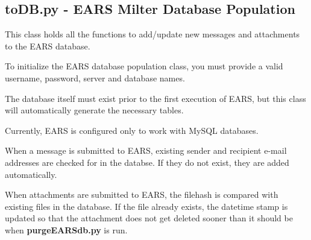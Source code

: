 \documentclass[letterpaper,10pt,english]{sphinxmanual}
\begin{document}
\label{codedocs/database:module-database.toDB}

\subsection{toDB.py - EARS Milter Database Population}
\label{codedocs/database:module-toDB.py}\label{codedocs/database:todb-py-ears-milter-database-population}

\begin{fulllineitems}
\label{codedocs/database:database.toDB.toDB}
This class holds all the functions to add/update new messages and attachments to the EARS database.

\begin{fulllineitems}
\label{codedocs/database:database.toDB.toDB.__init__}
To initialize the EARS database population class,  you must provide a valid
username, password, server and database names.

The database itself must exist prior to the first execution of EARS, but this class
will automatically generate the necessary tables.

Currently, EARS is configured only to work with MySQL databases.

\end{fulllineitems}


\begin{fulllineitems}
\label{codedocs/database:database.toDB.toDB.newMessage}
When a message is submitted to EARS, existing sender and recipient e-mail addresses are checked for
in the databse.  If they do not exist, they are added automatically.

\end{fulllineitems}


\begin{fulllineitems}
\label{codedocs/database:database.toDB.toDB.addAttachment}
When attachments are submitted to EARS, the filehash is compared with existing files in the database.
If the file already exists, the datetime stamp is updated so that the attachment does not get deleted
sooner than it should be when \textbf{purgeEARSdb.py} is run.


\end{fulllineitems}
\end{fulllineitems}
\end{document}
